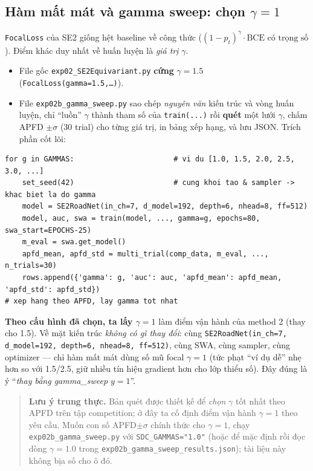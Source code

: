 \documentclass[11pt]{article}
\newcommand{\code}[1]{\textcolor{cInk}{\texttt{#1}}}
\newcommand{\fileB}{\code{exp02\_SE2Equivariant.py}}
\newcommand{\fileBb}{\code{exp02b\_gamma\_sweep.py}}
\theoremstyle{definition}
\begin{document}
\subsection{Hàm mất mát và \textbf{gamma sweep}: chọn $\gamma=1$}
\label{sec:gammaB}
\code{FocalLoss} của SE2 giống hệt baseline về công thức
($(1-p_t)^\gamma\cdot\text{BCE có trọng số}$). Điểm khác duy nhất về huấn luyện
là \emph{giá trị} $\gamma$.
\begin{itemize}[leftmargin=1.4em]
\item File gốc \fileB{} \textbf{cứng} $\gamma=1.5$ (\code{FocalLoss(gamma=1.5,\dots)}).
\item File \fileBb{} sao chép \emph{nguyên văn} kiến trúc và vòng huấn luyện,
chỉ ``luồn'' $\gamma$ thành tham số của \code{train(...)} rồi \textbf{quét} một
lưới $\gamma$, chấm APFD $\pm\sigma$ (30 trial) cho từng giá trị, in bảng xếp
hạng, và lưu JSON. Trích phần cốt lõi:
\end{itemize}
\begin{lstlisting}
for g in GAMMAS:                       # vi du [1.0, 1.5, 2.0, 2.5, 3.0, ...]
    set_seed(42)                       # cung khoi tao & sampler -> khac biet la do gamma
    model = SE2RoadNet(in_ch=7, d_model=192, depth=6, nhead=8, ff=512)
    model, auc, swa = train(model, ..., gamma=g, epochs=80, swa_start=EPOCHS-25)
    m_eval = swa.get_model()
    apfd_mean, apfd_std = multi_trial(comp_data, m_eval, ..., n_trials=30)
    rows.append({'gamma': g, 'auc': auc, 'apfd_mean': apfd_mean, 'apfd_std': apfd_std})
# xep hang theo APFD, lay gamma tot nhat
\end{lstlisting}
\textbf{Theo cấu hình đã chọn, ta lấy $\boxed{\gamma=1}$} làm điểm vận hành của
method 2 (thay cho 1.5). Về mặt kiến trúc \emph{không có gì thay đổi}: cùng
\code{SE2RoadNet(in\_ch=7, d\_model=192, depth=6, nhead=8, ff=512)}, cùng SWA,
cùng sampler, cùng optimizer --- chỉ hàm mất mát dùng số mũ focal
$\gamma=1$ (tức phạt ``ví dụ dễ'' nhẹ hơn so với 1.5/2.5, giữ nhiều tín hiệu
gradient hơn cho lớp thiểu số). Đây đúng là ý ``\emph{thay bằng gamma\_sweep
$y{=}1$}''.

\begin{quote}\small
\textbf{Lưu ý trung thực.} Bản quét được thiết kế để \emph{chọn} $\gamma$ tốt
nhất theo APFD trên tập competition; ở đây ta cố định điểm vận hành
$\gamma=1$ theo yêu cầu. Muốn con số APFD$\pm\sigma$ chính thức cho
$\gamma=1$, chạy \fileBb{} với \code{SDC\_GAMMAS="1.0"} (hoặc để mặc định rồi
đọc dòng $\gamma{=}1.0$ trong \code{exp02b\_gamma\_sweep\_results.json}); tài
liệu này không bịa số cho ô đó.
\end{quote}
\end{document}
